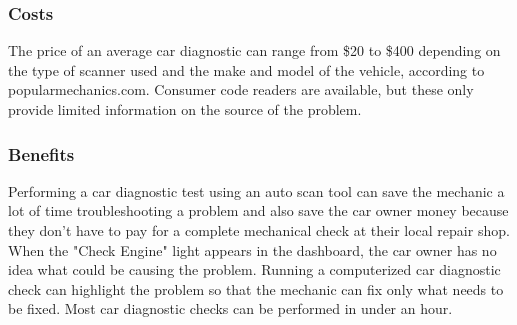 \subsubsection{Costs}
The price of an average car diagnostic can range from \$20 to \$400 depending on the type of scanner used and the make and model of the vehicle, according to popularmechanics.com. Consumer code readers are available, but these only provide limited information on the source of the problem.

\subsubsection{Benefits}
Performing a car diagnostic test using an auto scan tool can save the mechanic a lot of time troubleshooting a problem and also save the car owner money because they don't have to pay for a complete mechanical check at their local repair shop. When the "Check Engine" light appears in the dashboard, the car owner has no idea what could be causing the problem. Running a computerized car diagnostic check can highlight the problem so that the mechanic can fix only what needs to be fixed. Most car diagnostic checks can be performed in under an hour.



